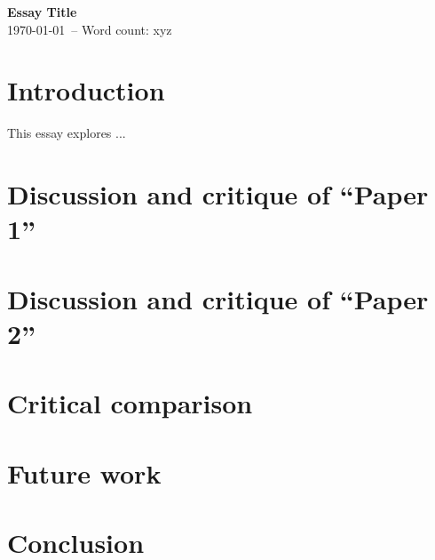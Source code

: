 \documentclass[12pt]{article}
\begin{document}
\begin{center}
    \Huge\textbf{Essay Title} \\
    \vspace{2mm}
    \large{\today\ -- Word count: xyz}
\end{center}
\vspace{5mm}


\section{Introduction}
This essay explores ...



\section{Discussion and critique of ``Paper 1'' \cite{}}





\section{Discussion and critique of ``Paper 2'' \cite{}}





\section{Critical comparison}





\section{Future work}



\section{Conclusion}



\printbibliography[heading=bibnumbered]
% 
% 



\appendix
\end{document}
